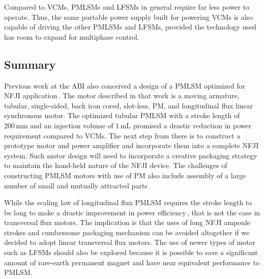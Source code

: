         
        
        Compared to \acsp{VCM}, \acsp{PMLSM} and \acsp{LFSM} in general require far less power to operate. Thus, the same portable power supply built for powering \acsp{VCM} is also capable of driving the other \acsp{PMLSM} and \acsp{LFSM}, provided the technology used has room to expand for multiphase control.
        
        
    \subsection{Summary}                         \label{Chapter:background/linear synchronous motors for NFJI/summary}
        
        
        Previous work at the ABI also conceived a design of a \ac{PMLSM} optimized for \acs{NFJI} application\,\cite{Ruddy2015}. The motor described in that work is a moving armature, tubular, single-sided, back iron cored, slot-less, \acs{PM}, and longitudinal flux linear synchronous motor. The optimized tubular \acs{PMLSM} with a stroke length of $\mathrm{200\,mm}$ and an injection volume of $\mathrm{1\,mL}$ promised a drastic reduction in power requirement compared to \acsp{VCM}. The next step from there is to construct a prototype motor and power amplifier and incorporate them into a complete \acs{NFJI} system. Such motor design will need to incorporate a creative packaging strategy to maintain the hand-held nature of the \acs{NFJI} device. The challenges of constructing \acs{PMLSM} motors with use of PM also include assembly of a large number of small and mutually attracted parts\,\cite{Hwang2012,Shin2012}.
        
        
        While the scaling law of longitudinal flux \acs{PMLSM} requires the stroke length to be long to make a drastic improvement in power efficiency\,\cite{Laithwaite1970}, that is not the case in transversal flux motors. The implication is that the uses of long \acs{NFJI} ampoule strokes and cumbersome packaging mechanism can be avoided altogether if we decided to adopt linear transversal flux motors. The use of newer types of motor such as \acsp{LFSM} should also be explored because it is possible to save a significant amount of rare-earth permanent magnet and have near equivalent performance to \acs{PMLSM}.


